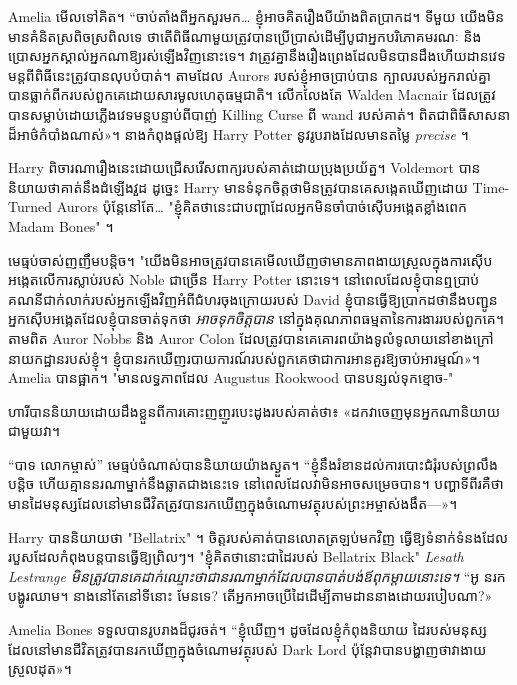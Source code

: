 Amelia មើលទៅគិត។ “ចាប់តាំងពីអ្នកសួរមក… ខ្ញុំអាចគិតរឿងបីយ៉ាងពិតប្រាកដ។ ទីមួយ យើងមិនមានគំនិតស្រពិចស្រពិលទេ ថាតើពិធីណាមួយត្រូវបានប្រើប្រាស់ដើម្បីបូជាអ្នកបរិភោគមរណៈ និងប្រោសអ្នកស្គាល់អ្នកណាឱ្យរស់ឡើងវិញនោះទេ។ វា​ត្រូវ​គ្នា​នឹង​រឿងព្រេង​ដែល​មិន​បាន​ដឹង​ហើយ​ដាន​វេទមន្ត​ពី​ពិធី​នេះ​ត្រូវ​បាន​លុប​បំបាត់​។ តាម​ដែល Aurors របស់ខ្ញុំ​អាច​ប្រាប់​បាន ក្បាល​របស់​អ្នក​រាល់​គ្នា​បាន​ធ្លាក់​ពី​ក​របស់​ពួកគេ​ដោយ​សារ​មូលហេតុ​ធម្មជាតិ។ លើកលែងតែ Walden Macnair ដែលត្រូវបានសម្លាប់ដោយភ្លើងវេទមន្តបន្ទាប់ពីបាញ់ Killing Curse ពី wand របស់គាត់។ ពិត​ជា​ពិធី​សាសនា​ដ៏​អាថ៌កំបាំង​ណាស់»។ នាងកំពុងផ្តល់ឱ្យ Harry Potter នូវរូបរាងដែលមានតម្លៃ \emph{precise} ។

Harry ពិចារណារឿងនេះដោយជ្រើសរើសពាក្យរបស់គាត់ដោយប្រុងប្រយ័ត្ន។ Voldemort បាននិយាយថាគាត់នឹងដំឡើងវួដ ដូច្នេះ Harry មានទំនុកចិត្តថាមិនត្រូវបានគេសង្កេតឃើញដោយ Time-Turned Aurors ប៉ុន្តែនៅតែ… "ខ្ញុំគិតថានេះជាបញ្ហាដែលអ្នកមិនចាំបាច់ស៊ើបអង្កេតខ្លាំងពេក Madam Bones" ។

មេធ្មប់ចាស់ញញឹមបន្តិច។ "យើងមិនអាចត្រូវបានគេមើលឃើញថាមានភាពងាយស្រួលក្នុងការស៊ើបអង្កេតលើការស្លាប់របស់ Noble ជាច្រើន Harry Potter នោះទេ។ នៅពេលដែលខ្ញុំបានឮប្រាប់គណនីជាក់លាក់របស់អ្នកឡើងវិញអំពីជំហរចុងក្រោយរបស់ David ខ្ញុំបានធ្វើឱ្យប្រាកដថានឹងបញ្ជូនអ្នកស៊ើបអង្កេតដែលខ្ញុំបានចាត់ទុកថា \emph{អាចទុកចិត្តបាន} នៅក្នុងគុណភាពធម្មតានៃការងាររបស់ពួកគេ។ តាមពិត Auror Nobbs និង Auror Colon ដែលត្រូវបានគេគោរពយ៉ាងទូលំទូលាយនៅខាងក្រៅនាយកដ្ឋានរបស់ខ្ញុំ។ ខ្ញុំ​បាន​រក​ឃើញ​របាយការណ៍​របស់​ពួក​គេ​ថា​ជា​ការ​អាន​គួរ​ឱ្យ​ចាប់​អារម្មណ៍»។ Amelia បានផ្អាក។ "មានលទ្ធភាពដែល Augustus Rookwood បានបន្សល់ទុកខ្មោច-"

ហារី​បាន​និយាយ​ដោយ​ដឹង​ខ្លួន​ពី​ការ​គោះ​ញញួរ​បេះដូង​របស់​គាត់​ថា​៖ «​ដក​វា​ចេញ​មុន​អ្នក​ណា​និយាយ​ជាមួយ​វា​។

“បាទ លោកម្ចាស់” មេធ្មប់ចំណាស់បាននិយាយយ៉ាងស្ងួត។ “ខ្ញុំនឹងរំខានដល់ការបោះជំរុំរបស់ព្រលឹងបន្តិច ហើយគ្មាននរណាម្នាក់នឹងឆ្លាតជាងនេះទេ នៅពេលដែលវាមិនអាចសម្រេចបាន។ បញ្ហា​ទី​ពីរ​គឺ​ថា មាន​ដៃ​មនុស្ស​ដែល​នៅ​មាន​ជីវិត​ត្រូវ​បាន​រក​ឃើញ​ក្នុង​ចំណោម​វត្ថុ​របស់​ព្រះអម្ចាស់​ងងឹត—»។

Harry បាននិយាយថា "Bellatrix" ។ ចិត្តរបស់គាត់បានលោតត្រឡប់មកវិញ ធ្វើឱ្យទំនាក់ទំនងដែលរបួសដែលកំពុងបន្តបានធ្វើឱ្យព្រិលៗ។ "ខ្ញុំគិតថានោះជាដៃរបស់ Bellatrix Black" \emph{Lesath Lestrange មិនត្រូវបានគេដាក់ឈ្មោះថាជានរណាម្នាក់ដែលបានបាត់បង់ឪពុកម្តាយនោះទេ។} “អូ នរកបង្ហូរឈាម។ នាងនៅតែនៅទីនោះ មែនទេ? តើ​អ្នក​អាច​ប្រើ​ដៃ​ដើម្បី​តាម​ដាន​នាង​ដោយ​របៀប​ណា?»

Amelia Bones ទទួលបានរូបរាងដ៏ជូរចត់។ “ខ្ញុំឃើញ។ ដូចដែលខ្ញុំកំពុងនិយាយ ដៃរបស់មនុស្សដែលនៅមានជីវិតត្រូវបានរកឃើញក្នុងចំណោមវត្ថុរបស់ Dark Lord ប៉ុន្តែវាបានបង្ហាញថាវាងាយស្រួលដុត»។

